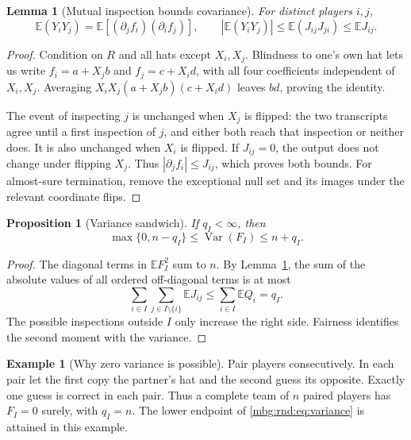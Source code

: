 \documentclass[11pt,letterpaper]{article}
\newtheorem{lemma}[theorem]{Lemma}
\newtheorem{proposition}[theorem]{Proposition}
\theoremstyle{definition}
\newtheorem{example}[theorem]{Example}
\newcommand{\E}{\mathbb E}
\DeclareMathOperator{\Var}{Var}
\begin{document}
\begin{lemma}[Mutual inspection bounds covariance]
\label{mbg:rnd:lem:covariance}
For distinct players $i,j$,
\begin{equation}
 \E(Y_iY_j)=\E[(\partial_j f_i)(\partial_i f_j)],
 \qquad
 |\E(Y_iY_j)|\le\E(J_{ij}J_{ji})\le\E J_{ij}.
 \label{mbg:rnd:eq:covariance}
\end{equation}
\end{lemma}
\begin{proof}
Condition on $R$ and all hats except $X_i,X_j$. Blindness to one's own
hat lets us write $f_i=a+X_jb$ and $f_j=c+X_id$, with all four
coefficients independent of $X_i,X_j$. Averaging
$X_iX_j(a+X_jb)(c+X_id)$ leaves $bd$, proving the identity.

The event of inspecting $j$ is unchanged when $X_j$ is flipped: the two
transcripts agree until a first inspection of $j$, and either both
reach that inspection or neither does. It is also unchanged when $X_i$
is flipped. If $J_{ij}=0$, the output does not change under flipping
$X_j$. Thus $|\partial_j f_i|\le J_{ij}$, which proves both bounds.
For almost-sure termination, remove the exceptional null set and its
images under the relevant coordinate flips.
\end{proof}

\begin{proposition}[Variance sandwich]
\label{mbg:rnd:prop:variance}
If $q_I<\infty$, then
\begin{equation}
 \max\{0,n-q_I\}\le\Var(F_I)\le n+q_I.
 \label{mbg:rnd:eq:variance}
\end{equation}
\end{proposition}
\begin{proof}
The diagonal terms in $\E F_I^2$ sum to $n$. By
Lemma~\ref{mbg:rnd:lem:covariance}, the sum of the absolute values of all ordered
off-diagonal terms is at most
\[
 \sum_{i\in I}\sum_{j\in I\setminus\{i\}}\E J_{ij}
 \le\sum_{i\in I}\E Q_i=q_I.
\]
The possible inspections outside $I$ only increase the right side.
Fairness identifies the second moment with the variance.
\end{proof}

\begin{example}[Why zero variance is possible]
Pair players consecutively. In each pair let the first copy the
partner's hat and the second guess its opposite. Exactly one guess is
correct in each pair. Thus a complete team of $n$ paired players has
$F_I=0$ surely, with $q_I=n$. The lower endpoint of
\eqref{mbg:rnd:eq:variance} is attained in this example.
\end{example}
\end{document}
